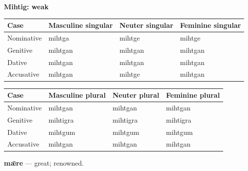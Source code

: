 \textbf{Mihtig: weak}

\par\begingroup
\fontsize{10.5}{13.2}\selectfont
\setlength{\LTleft}{0pt}\setlength{\LTright}{\fill}
\noindent
\begin{tabular}{@{}>{\raggedright\arraybackslash}p{22.0mm}>{\raggedright\arraybackslash}p{31.188mm}>{\raggedright\arraybackslash}p{31.188mm}>{\raggedright\arraybackslash}p{31.188mm}@{}}
\toprule
\textbf{Case} & \textbf{Masculine singular} & \textbf{Neuter singular} & \textbf{Feminine singular} \\
\midrule
Nominative & mihtga & mihtge & mihtge \\
Genitive & mihtgan & mihtgan & mihtgan \\
Dative & mihtgan & mihtgan & mihtgan \\
Accusative & mihtgan & mihtge & mihtgan \\
\bottomrule
\end{tabular}
\par\endgroup
\par\addvspace{5pt}
\par\begingroup
\fontsize{10.5}{13.2}\selectfont
\setlength{\LTleft}{0pt}\setlength{\LTright}{\fill}
\noindent
\begin{tabular}{@{}>{\raggedright\arraybackslash}p{22.0mm}>{\raggedright\arraybackslash}p{31.188mm}>{\raggedright\arraybackslash}p{31.188mm}>{\raggedright\arraybackslash}p{31.188mm}@{}}
\toprule
\textbf{Case} & \textbf{Masculine plural} & \textbf{Neuter plural} & \textbf{Feminine plural} \\
\midrule
Nominative & mihtgan & mihtgan & mihtgan \\
Genitive & mihtigra & mihtigra & mihtigra \\
Dative & mihtgum & mihtgum & mihtgum \\
Accusative & mihtgan & mihtgan & mihtgan \\
\bottomrule
\end{tabular}
\par\endgroup

\textbf{mǣre} — great; renowned.

